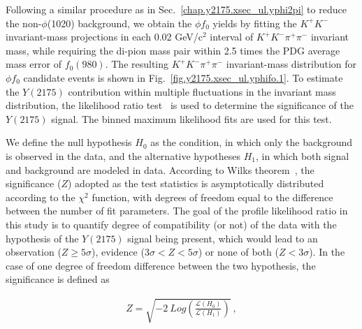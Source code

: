 Following a similar procedure as in Sec.~\ref{chap.y2175.xsec_ul.yphi2pi} to reduce the non-$\phi$(1020) background, we obtain the $\phi f_{0}$ yields by fitting the $K^{+}K^{-}$ invariant-mass projections in each 0.02 GeV/c$^{2}$ interval of $K^{+}K^{-}\pi^{+}\pi^{-}$ invariant mass, while requiring the di-pion mass pair within 2.5 times the PDG average mass error of $f_0(980)$. The resulting $K^{+}K^{-}\pi^{+}\pi^{-}$ invariant-mass distribution for $\phi f_{0}$ candidate events is shown in Fig.~\ref{fig.y2175.xsec_ul.yphifo.1}. To estimate the $Y(2175)$ contribution within multiple fluctuations in the invariant mass distribution, the likelihood ratio test~\cite{Cow11} is used to determine the significance of the $Y(2175)$ signal. The binned maximum likelihood fits are used for this test.
~\par We define the null hypothesis $H_{0}$ as the condition, in which only the background is observed in the data, and the alternative hypotheses $H_{1}$, in which both signal and background are modeled in data. According to Wilks theorem~\cite{Wil01}, the significance ($Z$) adopted as the test statistics is asymptotically distributed according to the $\chi^{2}$ function, with degrees of freedom equal to the difference between the number of fit parameters. The goal of the profile likelihood ratio in this study is to quantify degree of compatibility (or not) of the data with the hypothesis of the $Y(2175)$ signal being present, which would lead to an observation ($Z \geq 5\sigma$), evidence ($3\sigma < Z < 5\sigma$) or none of both ($Z < 3\sigma$). In the case of one degree of freedom difference between the two hypothesis, the significance is defined as

\begin{equation}
    \label{eq.y2175.xsec_ul.yphifo}
    \begin{aligned}
        Z = \sqrt{-2~Log\left(\frac{\mathcal{L}(H_{0})}{\mathcal{L}(H_{1})}\right)}~,
    \end{aligned}
\end{equation}

